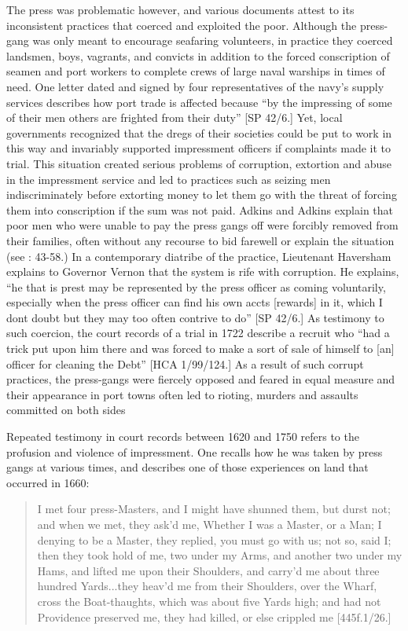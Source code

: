 The press was problematic however, and various documents attest to its inconsistent practices that coerced and exploited the poor. Although the press-gang was only meant to encourage seafaring volunteers, in practice they coerced landsmen, boys, vagrants, and convicts in addition to the forced conscription of seamen and port workers to complete crews of large naval warships in times of need. One letter dated \citealt{March1700} and signed by four representatives of the navy’s supply services describes how port trade is affected because “by the impressing of some of their men others are frighted from their duty” [SP 42/6.] Yet, local governments recognized that the dregs of their societies could be put to work in this way and invariably supported impressment officers if complaints made it to trial. This situation created serious problems of corruption, extortion and abuse in the impressment service and led to practices such as seizing men indiscriminately before extorting money to let them go with the threat of forcing them into conscription if the sum was not paid. Adkins and Adkins explain that poor men who were unable to pay the press gangs off were forcibly removed from their families, often without any recourse to bid farewell or explain the situation (see \citealt{AdkinsAdkins2008}: 43-58.) In a contemporary diatribe of the practice, Lieutenant Haversham explains to Governor Vernon that the system is rife with corruption. He explains, “he that is prest may be represented by the press officer as coming voluntarily, especially when the press officer can find his own accts [rewards] in it, which I dont doubt but they may too often contrive to do” [SP 42/6.] As testimony to such coercion, the court records of a trial in 1722 describe a recruit who “had a trick put upon him there and was forced to make a sort of sale of himself to [an] officer for cleaning the Debt” [HCA 1/99/124.] As a result of such corrupt practices, the press-gangs were fiercely opposed and feared in equal measure and their appearance in port towns often led to rioting, murders and assaults committed on both sides 

Repeated testimony in court records between 1620 and 1750 refers to the profusion and violence of impressment. One  recalls how he was taken by press gangs at various times, and describes one of those experiences on land that occurred in 1660:

\begin{quotation}
I met four press-Masters, and I might have shunned them, but durst not; and when we met, they ask’d me, Whether I was a Master, or a Man; I denying to be a Master, they replied, you must go with us; not so, said I; then they took hold of me, two under my Arms, and another two under my Hams, and lifted me upon their Shoulders, and carry’d me about three hundred Yards...they heav’d me from their Shoulders, over the Wharf, cross the Boat-thaughts, which was about five Yards high; and had not Providence preserved me, they had killed, or else crippled me [445f.1/26.]\end{quotation}

